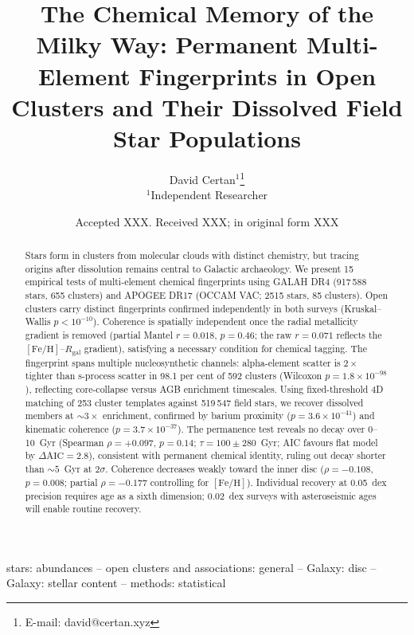 \documentclass[fleqn,usenatbib]{mnras}
\title[Chemical Memory of the Milky Way]{The Chemical Memory of the Milky Way: Permanent Multi-Element Fingerprints in Open Clusters and Their Dissolved Field Star Populations}
\author[D. Certan]{David Certan$^{1}$\thanks{E-mail: david@certan.xyz}\\
$^{1}$Independent Researcher}
\date{Accepted XXX. Received XXX; in original form XXX}
\newcommand{\feh}{$\mathrm{[Fe/H]}$\xspace}
\begin{document}
\label{firstpage}
\pagerange{\pageref{firstpage}--\pageref{lastpage}}
\maketitle

\begin{abstract}
Stars form in clusters from molecular clouds with distinct chemistry, but tracing origins after dissolution remains central to Galactic archaeology.
We present 15 empirical tests of multi-element chemical fingerprints using GALAH DR4 (917\,588 stars, 655 clusters) and APOGEE DR17 (OCCAM VAC; 2515 stars, 85 clusters).
Open clusters carry distinct fingerprints confirmed independently in both surveys (Kruskal--Wallis $p < 10^{-10}$).
Coherence is spatially independent once the radial metallicity gradient is removed (partial Mantel $r = 0.018$, $p = 0.46$; the raw $r = 0.071$ reflects the \feh--$R_{\mathrm{gal}}$ gradient), satisfying a necessary condition for chemical tagging.
The fingerprint spans multiple nucleosynthetic channels: alpha-element scatter is $2\times$ tighter than s-process scatter in 98.1 per cent of 592 clusters (Wilcoxon $p = 1.8 \times 10^{-98}$), reflecting core-collapse versus AGB enrichment timescales.
Using fixed-threshold 4D matching of 253 cluster templates against 519\,547 field stars, we recover dissolved members at ${\sim}3\times$ enrichment, confirmed by barium proximity ($p = 3.6 \times 10^{-41}$) and kinematic coherence ($p = 3.7 \times 10^{-37}$).
The permanence test reveals no decay over 0--10~Gyr (Spearman $\rho = +0.097$, $p = 0.14$; $\tau = 100 \pm 280$~Gyr; AIC favours flat model by $\Delta\mathrm{AIC} = 2.8$), consistent with permanent chemical identity, ruling out decay shorter than ${\sim}5$~Gyr at $2\sigma$.
Coherence decreases weakly toward the inner disc ($\rho = -0.108$, $p = 0.008$; partial $\rho = -0.177$ controlling for \feh).
Individual recovery at 0.05~dex precision requires age as a sixth dimension; 0.02~dex surveys with asteroseismic ages will enable routine recovery.
\end{abstract}

\begin{keywords}
stars: abundances -- open clusters and associations: general -- Galaxy: disc -- Galaxy: stellar content -- methods: statistical
\end{keywords}


\end{document}
